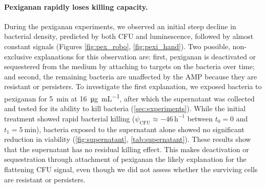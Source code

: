 \paragraph{Pexiganan rapidly loses killing capacity.}
During the pexiganan experiments, we observed an initial steep decline in bacterial density, predicted by both CFU and luminescence, followed by almost constant signals (Figures \ref{fig:pex_robo}, \ref{fig:pexi_hand}).
Two possible, non-exclusive explanations for this observation are: first, pexiganan is deactivated or sequestered from the medium by attaching to targets on the bacteria over time; and second, the remaining bacteria are unaffected by the AMP because they are resistant or persisters.
To investigate the first explanation, we exposed bacteria to pexiganan for \SI{5}{\minute} at \SI{16}{\micro\gram\per\milli\liter}, after which the supernatant was collected and tested for its ability to kill bacteria (\autoref{sec:experiments}).
While the initial treatment showed rapid bacterial killing ($\psi_{\text{CFU}} \approx -46\,\mathrm{h}^{-1}$ between $t_0 = 0$ and $t_1 = \SI{5}{\minute}$), bacteria exposed to the supernatant alone showed no significant reduction in viability (\autoref{fig:supernatant}, \autoref{tab:supernatant}).
These results show that the supernatant has no residual killing effect.
This makes deactivation or sequestration through attachment of pexiganan the likely explanation for the flattening CFU signal, even though we did not assess whether the surviving cells are resistant or persisters.
